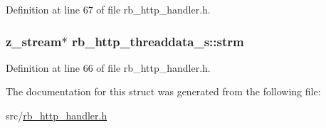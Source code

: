 Definition at line 67 of file rb\+\_\+http\+\_\+handler.\+h.

\hypertarget{structrb__http__threaddata__s_a246a6899a601436b9c28e893b4c376e3}{}
\subsubsection[{strm}]{\setlength{\rightskip}{0pt plus 5cm}z\+\_\+stream$\ast$ rb\+\_\+http\+\_\+threaddata\+\_\+s\+::strm}\label{structrb__http__threaddata__s_a246a6899a601436b9c28e893b4c376e3}


Definition at line 66 of file rb\+\_\+http\+\_\+handler.\+h.



The documentation for this struct was generated from the following file\+:\begin{DoxyCompactItemize}
\item 
src/\hyperlink{rb__http__handler_8h}{rb\+\_\+http\+\_\+handler.\+h}\end{DoxyCompactItemize}
